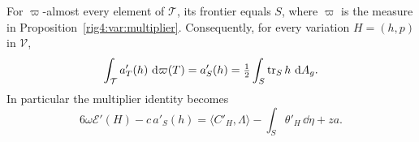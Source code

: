 \begin{proposition}
\label{rig4:var:area-localization}
For $\varpi$-almost every element of $\mathcal T$, its frontier equals $S$,
where $\varpi$ is the measure in Proposition~\ref{rig4:var:multiplier}.
Consequently, for every variation $H=(h,p)$ in $\mathcal V$,
\begin{equation}
 \int_{\mathcal T}a'_T(h)\,\,\mathrm d\varpi(T)
       =a'_S(h)=\tfrac12\int_S\operatorname{tr}_S h\,\,\mathrm d A_g.
\label{rig4:var:localized-area}
\end{equation}
In particular the multiplier identity becomes
\begin{equation}
 6\omega\mathcal E'(H)-c\,a'_S(h)
  =\langle C'_H,\Lambda\rangle
       -\int_S\theta'_H\,\dd\eta+za.
\label{rig4:var:localized-identity}
\end{equation}
\end{proposition}

